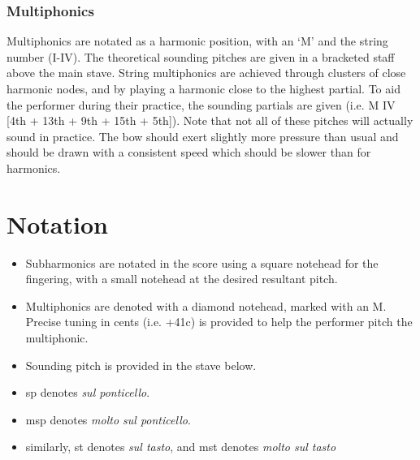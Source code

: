 \subsubsection*{Multiphonics}
Multiphonics are notated as a harmonic position, with an `M' and the string number (I-IV). 
The theoretical sounding pitches are given in a bracketed staff above the main stave.
String multiphonics are achieved through clusters of close harmonic nodes, and by playing a harmonic close to the highest partial.
To aid the performer during their practice, the sounding partials are given (i.e. M IV [4th + 13th + 9th + 15th + 5th]).
Note that not all of these pitches will actually sound in practice.
The bow should exert slightly more pressure than usual and should be drawn with a consistent speed which should be slower than for harmonics.

\section*{Notation}
\begin{itemize}

    \item Subharmonics are notated in the score using a square notehead for the fingering, with a small notehead at the desired resultant pitch.
    \item Multiphonics are denoted with a diamond notehead, marked with an M. Precise tuning in cents (i.e. +41c) is provided to help the performer pitch the multiphonic.
    \item Sounding pitch is provided in the stave below.
    \item sp denotes \emph{sul ponticello}.
    \item msp denotes \emph{molto sul ponticello}.
    \item similarly, st denotes \emph{sul tasto}, and mst denotes \emph{molto sul tasto}
\end{itemize}

\newpage

% 
\label{app:The Veldt Score}
